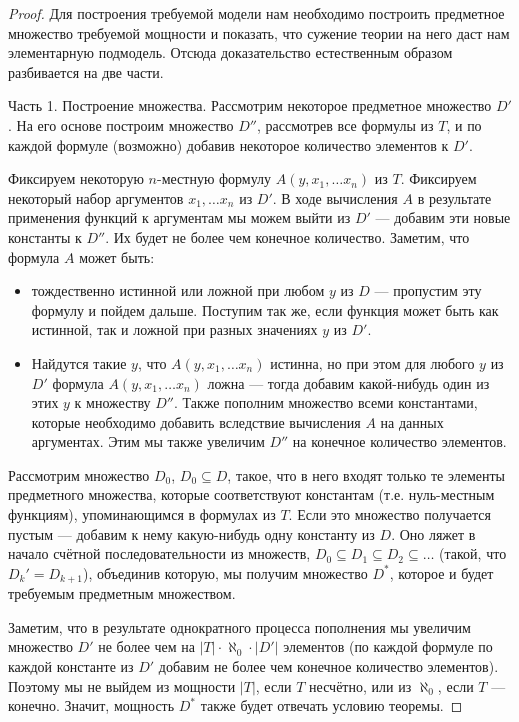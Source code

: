 \begin{proof}
Для построения требуемой модели нам необходимо построить предметное множество
требуемой мощности и показать, что сужение теории на него даст нам 
элементарную подмодель. Отсюда доказательство естественным образом
разбивается на две части.

Часть 1. Построение множества. 
Рассмотрим некоторое предметное множество $D'$. На его основе
построим множество $D''$, рассмотрев все формулы из $T$, и 
по каждой формуле (возможно) добавив некоторое количество элементов
к $D'$. 

Фиксируем некоторую $n$-местную 
формулу $A(y, x_1, \dots x_n)$ из $T$. 
Фиксируем некоторый набор аргументов $x_1, \dots x_n$ из $D'$.
В ходе вычисления $A$ в результате применения функций к аргументам мы можем
выйти из $D'$ --- добавим эти новые константы к $D''$. Их будет не
более чем конечное количество. Заметим, что формула $A$ может быть:
\begin{itemize}
\item тождественно истинной или ложной при любом $y$ из $D$ --- 
пропустим эту формулу и пойдем дальше. Поступим так же, если функция
может быть как истинной, так и ложной при разных значениях $y$ из $D'$.
\item Найдутся такие $y$, что $A(y,x_1,\dots x_n)$ истинна, но при этом
для любого $y$ из $D'$ формула $A(y,x_1,\dots x_n)$ ложна --- тогда
добавим какой-нибудь один из этих $y$ к множеству $D''$. Также пополним
множество всеми константами, которые необходимо добавить вследствие
вычисления $A$ на данных аргументах. Этим мы также увеличим $D''$ на
конечное количество элементов.
\end{itemize}

Рассмотрим множество $D_0$, $D_0 \subseteq D$,
такое, что в него входят только те элементы предметного множества, которые
соответствуют константам (т.е. нуль-местным функциям), упоминающимся в
формулах из $T$. Если это множество получается пустым --- добавим 
к нему какую-нибудь одну константу из $D$. Оно ляжет в начало счётной
последовательности из множеств, $D_0 \subseteq D_1 \subseteq D_2 \subseteq \dots$
(такой, что $D_k' = D_{k+1}$), 
объединив которую, 
мы получим множество $D^*$, которое и будет требуемым предметным 
множеством.

Заметим, что в результате однократного процесса пополнения мы увеличим
множество $D'$ не более чем на $|T|\cdot \aleph_0\cdot|D'|$ элементов
(по каждой формуле по каждой константе из $D'$ добавим не более чем конечное 
количество элементов). Поэтому мы не выйдем из мощности $|T|$, если $T$
несчётно, или из $\aleph_0$, если $T$ --- конечно.
Значит, мощность $D^*$ также будет отвечать условию теоремы.


\end{proof}
